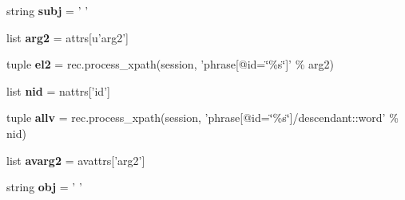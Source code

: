 \begin{DoxyCompactItemize}
\item 
\hypertarget{classcheshire3_1_1textmining_1_1document_factory_1_1_enju_record_document_stream_ae8ebf4cd865ebaabc3f785cb62ea4f86}{string {\bfseries subj} = ' '}\label{classcheshire3_1_1textmining_1_1document_factory_1_1_enju_record_document_stream_ae8ebf4cd865ebaabc3f785cb62ea4f86}

\item 
\hypertarget{classcheshire3_1_1textmining_1_1document_factory_1_1_enju_record_document_stream_a0e741cd2e16254502aecca51f1879f49}{list {\bfseries arg2} = attrs\mbox{[}u'arg2'\mbox{]}}\label{classcheshire3_1_1textmining_1_1document_factory_1_1_enju_record_document_stream_a0e741cd2e16254502aecca51f1879f49}

\item 
\hypertarget{classcheshire3_1_1textmining_1_1document_factory_1_1_enju_record_document_stream_a137aacf4793e44d2317af262aabe32b5}{tuple {\bfseries el2} = rec.\-process\-\_\-xpath(session, 'phrase\mbox{[}@id=\char`\"{}\%s\char`\"{}\mbox{]}' \% arg2)}\label{classcheshire3_1_1textmining_1_1document_factory_1_1_enju_record_document_stream_a137aacf4793e44d2317af262aabe32b5}

\item 
\hypertarget{classcheshire3_1_1textmining_1_1document_factory_1_1_enju_record_document_stream_ac1df7784ed4e2928535c016785b34ca6}{list {\bfseries nid} = nattrs\mbox{[}'id'\mbox{]}}\label{classcheshire3_1_1textmining_1_1document_factory_1_1_enju_record_document_stream_ac1df7784ed4e2928535c016785b34ca6}

\item 
\hypertarget{classcheshire3_1_1textmining_1_1document_factory_1_1_enju_record_document_stream_a3e1cc8bbf7b843906b08f479f9ddeb53}{tuple {\bfseries allv} = rec.\-process\-\_\-xpath(session, 'phrase\mbox{[}@id=\char`\"{}\%s\char`\"{}\mbox{]}/descendant\-::word' \% nid)}\label{classcheshire3_1_1textmining_1_1document_factory_1_1_enju_record_document_stream_a3e1cc8bbf7b843906b08f479f9ddeb53}

\item 
\hypertarget{classcheshire3_1_1textmining_1_1document_factory_1_1_enju_record_document_stream_a2c395d847624a0a07eb87fc06e57f2bd}{list {\bfseries avarg2} = avattrs\mbox{[}'arg2'\mbox{]}}\label{classcheshire3_1_1textmining_1_1document_factory_1_1_enju_record_document_stream_a2c395d847624a0a07eb87fc06e57f2bd}

\item 
\hypertarget{classcheshire3_1_1textmining_1_1document_factory_1_1_enju_record_document_stream_a562b2c5c01ea4a37d0331227be80ca8b}{string {\bfseries obj} = ' '}\label{classcheshire3_1_1textmining_1_1document_factory_1_1_enju_record_document_stream_a562b2c5c01ea4a37d0331227be80ca8b}


\end{DoxyCompactItemize}
